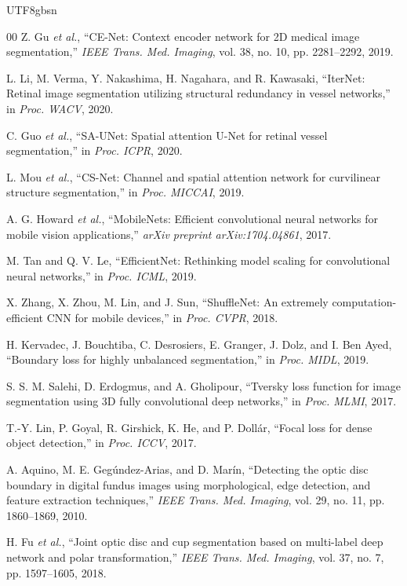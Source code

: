 \documentclass[conference]{IEEEtran}
\begin{document}
\begin{CJK}{UTF8}{gbsn}
\begin{thebibliography}{00}
Z. Gu \emph{et al.}, ``CE-Net: Context encoder network for 2D medical image segmentation,'' \emph{IEEE Trans. Med. Imaging}, vol. 38, no. 10, pp. 2281--2292, 2019.

L. Li, M. Verma, Y. Nakashima, H. Nagahara, and R. Kawasaki, ``IterNet: Retinal image segmentation utilizing structural redundancy in vessel networks,'' in \emph{Proc. WACV}, 2020.

C. Guo \emph{et al.}, ``SA-UNet: Spatial attention U-Net for retinal vessel segmentation,'' in \emph{Proc. ICPR}, 2020.

L. Mou \emph{et al.}, ``CS-Net: Channel and spatial attention network for curvilinear structure segmentation,'' in \emph{Proc. MICCAI}, 2019.

A. G. Howard \emph{et al.}, ``MobileNets: Efficient convolutional neural networks for mobile vision applications,'' \emph{arXiv preprint arXiv:1704.04861}, 2017.

M. Tan and Q. V. Le, ``EfficientNet: Rethinking model scaling for convolutional neural networks,'' in \emph{Proc. ICML}, 2019.

X. Zhang, X. Zhou, M. Lin, and J. Sun, ``ShuffleNet: An extremely computation-efficient CNN for mobile devices,'' in \emph{Proc. CVPR}, 2018.

H. Kervadec, J. Bouchtiba, C. Desrosiers, E. Granger, J. Dolz, and I. Ben Ayed, ``Boundary loss for highly unbalanced segmentation,'' in \emph{Proc. MIDL}, 2019.

S. S. M. Salehi, D. Erdogmus, and A. Gholipour, ``Tversky loss function for image segmentation using 3D fully convolutional deep networks,'' in \emph{Proc. MLMI}, 2017.

T.-Y. Lin, P. Goyal, R. Girshick, K. He, and P. Dollár, ``Focal loss for dense object detection,'' in \emph{Proc. ICCV}, 2017.

A. Aquino, M. E. Gegúndez-Arias, and D. Marín, ``Detecting the optic disc boundary in digital fundus images using morphological, edge detection, and feature extraction techniques,'' \emph{IEEE Trans. Med. Imaging}, vol. 29, no. 11, pp. 1860--1869, 2010.

H. Fu \emph{et al.}, ``Joint optic disc and cup segmentation based on multi-label deep network and polar transformation,'' \emph{IEEE Trans. Med. Imaging}, vol. 37, no. 7, pp. 1597--1605, 2018.


\end{thebibliography}
\end{CJK}
\end{document}
